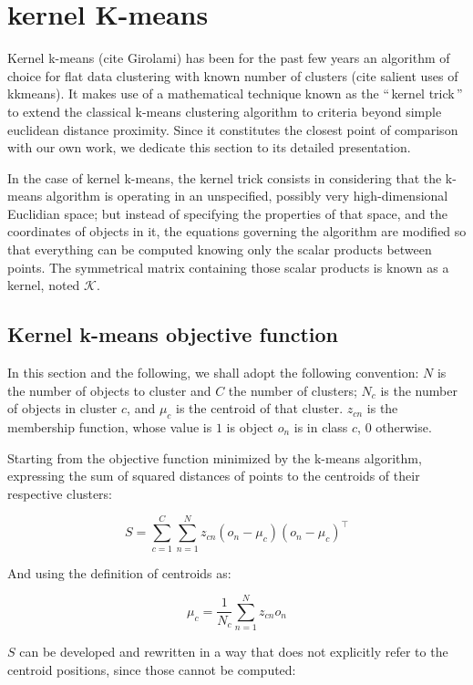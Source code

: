 \documentclass[a4paper,twoside]{article}
\newcommand{\gl}[1]{``\,#1\,''} %
\begin{document}
\section{kernel K-means} \label{sec:kkmeans}

Kernel k-means (cite Girolami) has been for the past few years an algorithm of choice for flat data clustering with known number of clusters (cite salient uses of kkmeans). It makes use of a mathematical technique known as the \gl{kernel trick} to extend the classical k-means clustering algorithm \cite{macQueenBsmsp67} to criteria beyond simple euclidean distance proximity. Since it constitutes the closest point of comparison with our own work, we dedicate this section to its detailed presentation.

In the case of kernel k-means, the kernel trick consists in considering that the k-means algorithm is operating in an unspecified, possibly very high-dimensional Euclidian space; but instead of specifying the properties of that space, and the coordinates of objects in it, the equations governing the algorithm are modified so that everything can be computed knowing only the scalar products between points. The symmetrical matrix  containing those scalar products is known as a kernel, noted $\mathcal{K}$.

\subsection{Kernel k-means objective function}

In this section and the following, we shall adopt the following convention: $N$ is the number of objects to cluster and $C$ the number of clusters; $N_c$ is the number of objects in cluster $c$, and $\mu_c$ is the centroid of that cluster. $z_{cn}$ is the membership function, whose value is $1$ is object $o_n$ is in class $c$, $0$ otherwise.

Starting from the objective function minimized by the k-means algorithm, expressing the sum of squared distances of points to the centroids of their respective clusters:

\[
S = \sum_{c=1}^{C} \sum_{n=1}^{N} z_{cn} \left(o_n-\mu_c\right)\left(o_n-\mu_c\right)^\top \label{eq:S}
\]

And using the definition of centroids as:

\[
\mu_c = \frac{1}{N_c}\sum_{n=1}^{N}z_{cn}o_n
\]

$S$ can be developed and rewritten in a way that does not explicitly refer to the centroid positions, since those cannot be computed:
\end{document}
